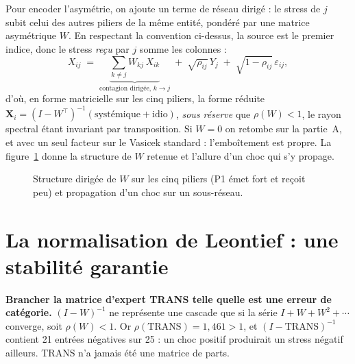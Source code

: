 Pour encoder l'asymétrie, on ajoute un terme de réseau dirigé : le stress de $j$ subit celui des
autres piliers de la même entité, pondéré par une matrice asymétrique $W$. En respectant
la convention ci-dessus, la source est le premier indice, donc le stress \emph{reçu} par $j$
somme les colonnes :
\begin{equation}
X_{ij} \;=\; \underbrace{\sum_{k\neq j} W_{kj}\,X_{ik}}_{\text{contagion dirigée, } k \to j}
   \;+\; \sqrt{\rho_{ij}}\,Y_j \;+\; \sqrt{1-\rho_{ij}}\,\varepsilon_{ij},
\end{equation}
d'où, en forme matricielle sur les cinq piliers, la forme réduite
$\mathbf X_i=(I-W^{\top})^{-1}(\text{systémique}+\text{idio})$, \emph{sous réserve} que
$\rho(W)<1$, le rayon spectral étant invariant par transposition. Si
$W=0$ on retombe sur la partie~A, et avec un seul facteur sur le Vasicek standard :
l'emboîtement est propre. La figure~\ref{fig:reseau-W} donne la structure de $W$ retenue et
l'allure d'un choc qui s'y propage.

\begin{figure}[htbp]\centering
{}
\caption{Structure dirigée de $W$ sur les cinq piliers (P1 émet fort et reçoit peu) et
propagation d'un choc sur un sous-réseau.}
\label{fig:reseau-W}
\end{figure}


\section{La normalisation de Leontief : une stabilité garantie}

\begin{attention}
\textbf{Brancher la matrice d'expert TRANS telle quelle est une erreur de catégorie.}
$(I-W)^{-1}$ ne représente une cascade que si la série $I+W+W^2+\cdots$ converge, soit
$\rho(W)<1$. Or $\rho(\mathrm{TRANS})=1{,}461>1$, et $(I-\mathrm{TRANS})^{-1}$ contient
21 entrées négatives sur 25 : un choc positif produirait un stress négatif ailleurs.
TRANS n'a jamais été une matrice de parts.
\end{attention}

